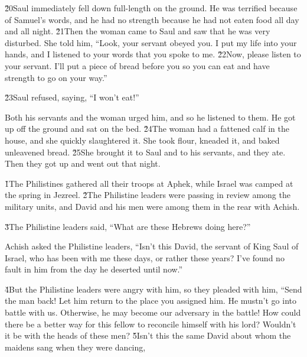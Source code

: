 \v{20}Saul immediately fell down full-length on the ground. He was terrified because of Samuel's words, and he had no strength because he had not eaten food all day and all night. \v{21}Then the woman came to Saul and saw that he was very disturbed. She told him, ``Look, your servant obeyed you. I put my life into your hands, and I listened to your words that you spoke to me. \v{22}Now, please listen to your servant. I'll put a piece of bread before you so you can eat and have strength to go on your way.''

\v{23}Saul refused, saying, ``I won't eat!''

Both his servants and the woman urged him, and so he listened to them. He got up off the ground and sat on the bed. \v{24}The woman had a fattened calf in the house, and she quickly slaughtered it. She took flour, kneaded it, and baked unleavened bread. \v{25}She brought it to Saul and to his servants, and they ate. Then they got up and went out that night.

\v{1}The Philistines gathered all their troops at Aphek, while Israel was camped at the spring in Jezreel. \v{2}The Philistine leaders were passing in review among the military units, and David and his men were among them in the rear with Achish.

\v{3}The Philistine leaders said, ``What are these Hebrews doing here?''

Achish asked the Philistine leaders, ``Isn't this David, the servant of King Saul of Israel, who has been with me these days, or rather these years? I've found no fault in him from the day he deserted until now.''

\v{4}But the Philistine leaders were angry with him, so they pleaded with him, ``Send the man back! Let him return to the place you assigned him. He mustn't go into battle with us. Otherwise, he may become our adversary in the battle! How could there be a better way for this fellow to reconcile himself with his lord? Wouldn't it be with the heads of these men? \v{5}Isn't this the same David about whom the maidens sang when they were dancing,

